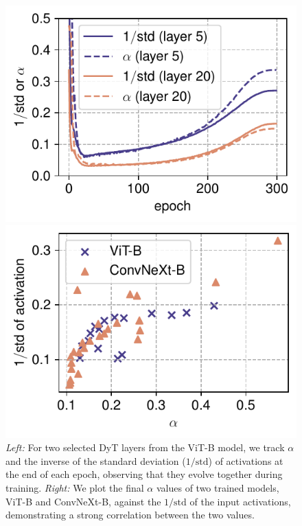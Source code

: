 \begin{figure}[t]
\begin{minipage}{0.39\textwidth}
\label{figure:hardtanh}
\end{minipage}
\hfill
\begin{minipage}{0.58\textwidth}
\centering
\begin{minipage}{0.48\textwidth}
\includegraphics[width=\linewidth]{figures/alpha_epoch.pdf}
\end{minipage}
\hfill
\begin{minipage}{0.48\textwidth}
\includegraphics[width=\linewidth]{figures/final_alpha.pdf}
\end{minipage}
\caption{\emph{Left:} For two selected DyT layers from the ViT-B model, we track $\alpha$ and the inverse of the standard deviation ($1/\mathrm{std}$) of activations at the end of each epoch, observing that they evolve together during training. \emph{Right:} We plot the final $\alpha$ values of two trained models, ViT-B and ConvNeXt-B, against the $1/\mathrm{std}$ of the input activations, demonstrating a strong correlation between the two values.}
\label{figure:all_three}
\end{minipage}
\end{figure}

